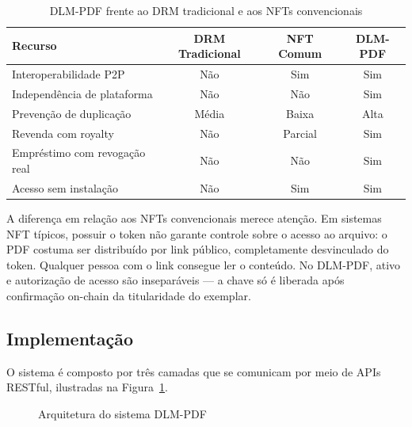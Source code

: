 \documentclass[12pt]{article}
\begin{document}
\begin{table}[H]
\centering
\caption{DLM-PDF frente ao DRM tradicional e aos NFTs convencionais}
\label{tab:comparativo}
\begin{tabular}{|l|c|c|c|}
\hline
\textbf{Recurso}              & \textbf{DRM Tradicional} & \textbf{NFT Comum} & \textbf{DLM-PDF} \\
\hline
Interoperabilidade P2P        & Não     & Sim      & Sim  \\
\hline
Independência de plataforma   & Não     & Não      & Sim  \\
\hline
Prevenção de duplicação       & Média   & Baixa    & Alta \\
\hline
Revenda com royalty           & Não     & Parcial  & Sim  \\
\hline
Empréstimo com revogação real & Não     & Não      & Sim  \\
\hline
Acesso sem instalação         & Não     & Sim      & Sim  \\
\hline
\end{tabular}
\end{table}

A diferença em relação aos NFTs convencionais merece atenção. Em sistemas NFT típicos, possuir o token não garante controle sobre o acesso ao arquivo: o PDF costuma ser distribuído por link público, completamente desvinculado do token. Qualquer pessoa com o link consegue ler o conteúdo. No DLM-PDF, ativo e autorização de acesso são inseparáveis — a chave só é liberada após confirmação on-chain da titularidade do exemplar.

\subsection{Implementação}

O sistema é composto por três camadas que se comunicam por meio de APIs RESTful, ilustradas na Figura~\ref{fig:arquitetura}.

\begin{figure}[H]
\centering
\caption{Arquitetura do sistema DLM-PDF}
\label{fig:arquitetura}
\end{figure}
\end{document}
